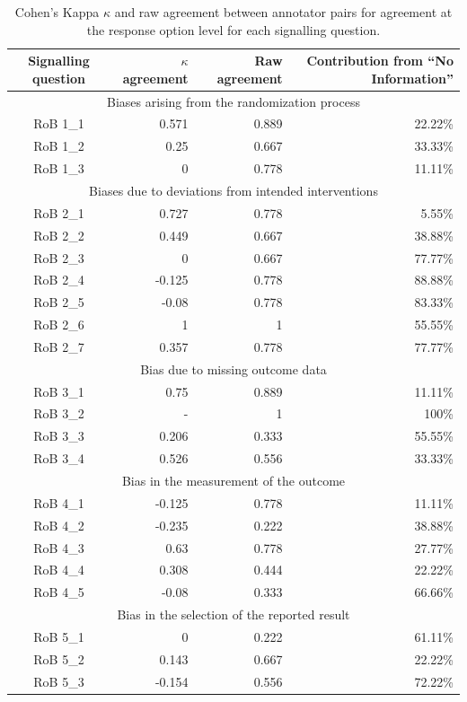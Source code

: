 \documentclass[sn-mathphys,Numbered]{sn-jnl}%
\theoremstyle{thmstyleone}%
\theoremstyle{thmstyletwo}%
\theoremstyle{thmstylethree}%
\begin{document}
%
%
%
\begin{table}[]
    \caption{Cohen's Kappa $\kappa$ and raw agreement between annotator pairs for agreement at the response option level for each signalling question.}
    \label{tab:IAA_response}
    \begin{tabular}{crrr}
    \toprule[1.0pt]
        Signalling question & $\kappa$ agreement & Raw agreement & Contribution from ``No Information'' \\
    \midrule[1.0pt]
        \multicolumn{4}{c}{Biases arising from the randomization process} \\
        \hline
        RoB 1\_1 & 0.571 & 0.889 & 22.22\% \\
        RoB 1\_2 & 0.25 & 0.667 & 33.33\% \\
        RoB 1\_3 & 0 & 0.778 & 11.11\% \\
        \hline
        \multicolumn{4}{c}{Biases due to deviations from intended interventions} \\
        \hline
        RoB 2\_1 & 0.727 & 0.778 & 5.55\% \\
        RoB 2\_2 & 0.449 & 0.667 & 38.88\% \\
        RoB 2\_3 & 0 & 0.667 & 77.77\% \\
        RoB 2\_4 & -0.125 & 0.778 & 88.88\% \\
        RoB 2\_5 & -0.08 & 0.778 & 83.33\% \\
        RoB 2\_6 & 1 & 1 & 55.55\% \\
        RoB 2\_7 & 0.357 & 0.778 & 77.77\% \\
        \hline
        \multicolumn{4}{c}{Bias due to missing outcome data} \\
        \hline
        RoB 3\_1 & 0.75 & 0.889 & 11.11\% \\
        RoB 3\_2 & - & 1 & 100\% \\
        RoB 3\_3 & 0.206 & 0.333 & 55.55\% \\
        RoB 3\_4 & 0.526 & 0.556 & 33.33\% \\
        \hline
        \multicolumn{4}{c}{Bias in the measurement of the outcome} \\
        \hline
        RoB 4\_1 & -0.125 & 0.778 & 11.11\% \\
        RoB 4\_2 & -0.235 & 0.222 & 38.88\% \\
        RoB 4\_3 & 0.63 & 0.778 & 27.77\% \\
        RoB 4\_4 & 0.308 & 0.444 & 22.22\% \\
        RoB 4\_5 & -0.08 & 0.333 & 66.66\% \\
        \hline
        \multicolumn{4}{c}{Bias in the selection of the reported result} \\
        \hline
        RoB 5\_1 & 0 & 0.222 & 61.11\% \\
        RoB 5\_2 & 0.143 & 0.667 & 22.22\% \\
        RoB 5\_3 & -0.154 & 0.556 & 72.22\% \\
    \bottomrule[1.0pt]
    \end{tabular}
\end{table}
\end{document}
